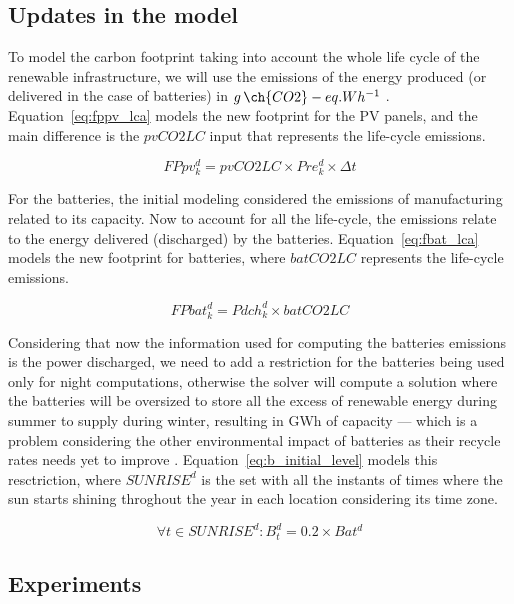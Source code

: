 \subsection{Updates in the model}

To model the carbon footprint taking into account the whole life cycle of the renewable infrastructure,  we will use the emissions of the energy produced (or
delivered in the case of batteries) in $g\,\ch{CO2}-eq.Wh^{-1}$ . Equation~\eqref{eq:fppv_lca} models the new footprint for the PV panels, and the main difference is the $pvCO2LC$ input that represents the life-cycle emissions.

\begin{equation} \label{eq:fppv_lca}
   FPpv^d_k =  pvCO2LC \times Pre_k^d \times \Delta t
\end{equation}


For the batteries, the initial modeling considered the emissions of manufacturing related to its capacity. Now to account for all the life-cycle, the emissions relate to the energy delivered (discharged) by the batteries. Equation~\eqref{eq:fbat_lca} models the new footprint for batteries, where $batCO2LC$ represents the life-cycle emissions. 

\begin{equation} \label{eq:fbat_lca}
   FPbat^d_k =  Pdch^d_k \times batCO2LC
 \end{equation}


Considering that now the information used for computing the  batteries emissions is the power discharged, we need to add a restriction for the batteries being used only for night computations, otherwise the solver will compute a solution where the batteries will be oversized to store all the excess of renewable energy during summer to supply during winter, resulting in GWh of capacity --- which is a problem considering the other environmental impact of batteries as their recycle rates needs yet to improve \cite{batteries_baumman}. Equation~\eqref{eq:b_initial_level}  models this resctriction, where $SUNRISE^d$ is the set with all the instants of times where the sun starts shining throghout the year in each location considering its time zone.

\begin{equation} \label{eq:b_initial_level}
  \forall t \in SUNRISE^d :  B^d_t =  0.2 \times Bat^d
\end{equation}

\subsection{Experiments}
\label{sec:ex_lca_pv}


